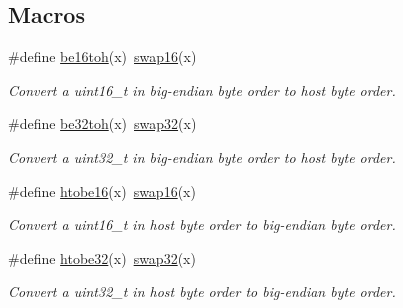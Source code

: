 \subsection*{Macros}
\begin{DoxyCompactItemize}
\item 
\mbox{\label{group__util__byteorder_gabb9b3120f6457dc04471c134fee1d221}} 
\#define \hyperlink{group__util__byteorder_gabb9b3120f6457dc04471c134fee1d221}{be16toh}(x)~\hyperlink{group__util__byteorder_ga7cf3526e1af5c8642d2ec02caecf99bc}{swap16}(x)
\begin{DoxyCompactList}\small\item\em Convert a uint16\+\_\+t in big-\/endian byte order to host byte order. \end{DoxyCompactList}\item 
\mbox{\label{group__util__byteorder_ga6acac399720b3a57d9050420aa0aac41}} 
\#define \hyperlink{group__util__byteorder_ga6acac399720b3a57d9050420aa0aac41}{be32toh}(x)~\hyperlink{group__util__byteorder_ga5bdbc60a02db00841f567d1ade52f877}{swap32}(x)
\begin{DoxyCompactList}\small\item\em Convert a uint32\+\_\+t in big-\/endian byte order to host byte order. \end{DoxyCompactList}\item 
\mbox{\label{group__util__byteorder_ga4b9167199621b390f82c3e5361ba6df6}} 
\#define \hyperlink{group__util__byteorder_ga4b9167199621b390f82c3e5361ba6df6}{htobe16}(x)~\hyperlink{group__util__byteorder_ga7cf3526e1af5c8642d2ec02caecf99bc}{swap16}(x)
\begin{DoxyCompactList}\small\item\em Convert a uint16\+\_\+t in host byte order to big-\/endian byte order. \end{DoxyCompactList}\item 
\mbox{\label{group__util__byteorder_gaa65407014913309932b9a5ea3c16a86d}} 
\#define \hyperlink{group__util__byteorder_gaa65407014913309932b9a5ea3c16a86d}{htobe32}(x)~\hyperlink{group__util__byteorder_ga5bdbc60a02db00841f567d1ade52f877}{swap32}(x)
\begin{DoxyCompactList}\small\item\em Convert a uint32\+\_\+t in host byte order to big-\/endian byte order. \end{DoxyCompactList}\item 

\end{DoxyCompactItemize}
